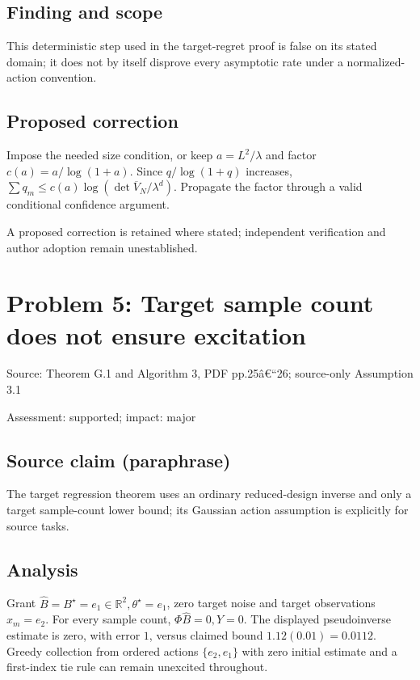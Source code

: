 \documentclass[11pt]{article}
\begin{document}
\subsection*{Finding and scope}

This deterministic step used in the target-regret proof is false on its stated domain; it does not by itself disprove every asymptotic rate under a normalized-action convention.

\subsection*{Proposed correction}

Impose the needed size condition, or keep \(a=L^2/\lambda\) and factor \(c(a)=a/\log(1+a)\). Since \(q/\log(1+q)\) increases, \(\sum q_m\le c(a)\log(\det\overline V_N/\lambda^d)\). Propagate the factor through a valid conditional confidence argument.

A proposed correction is retained where stated; independent verification and author adoption remain unestablished.

\section*{Problem 5: Target sample count does not ensure excitation}

Source: Theorem G.1 and Algorithm 3, PDF pp.25â€“26; source-only Assumption 3.1

Assessment: supported; impact: major

\subsection*{Source claim (paraphrase)}

The target regression theorem uses an ordinary reduced-design inverse and only a target sample-count lower bound; its Gaussian action assumption is explicitly for source tasks.

\subsection*{Analysis}

Grant \(\widehat B=B^\star=e_1\in\mathbb R^2,\theta^\star=e_1\), zero target noise and target observations \(x_m=e_2\). For every sample count, \(\Phi\widehat B=0,Y=0\). The displayed pseudoinverse estimate is zero, with error \(1\), versus claimed bound \(1.12(0.01)=0.0112\). Greedy collection from ordered actions \(\{e_2,e_1\}\) with zero initial estimate and a first-index tie rule can remain unexcited throughout.
\end{document}
